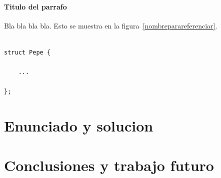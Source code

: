 \documentclass[a4paper]{article}
\newenvironment{codesnippet}{%
	\begin{Sbox}\begin{minipage}{\textwidth}\sffamily\small}%
	{\end{minipage}\end{Sbox}%
		\begin{center}%
		\vspace{-0.4cm}\colorbox{litegrey}{\TheSbox}\end{center}\vspace{0.3cm}}
\begin{document}
\paragraph{\textbf{Titulo del parrafo} } Bla bla bla bla.
Esto se muestra en la figura~\ref{nombreparareferenciar}.



\begin{codesnippet}
\begin{verbatim}

struct Pepe {

    ...

};

\end{verbatim}
\end{codesnippet}


\section{Enunciado y solucion} 
%
%

\section{Conclusiones y trabajo futuro}
\end{document}
